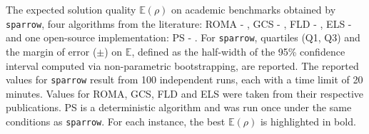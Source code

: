 \begin{table}[!tbp]
\captionsetup{width=0.95\textwidth}
\caption{
   The expected solution quality $\mathbb{E}(\rho)$ on academic benchmarks obtained by \texttt{sparrow}, four algorithms from the literature: ROMA - \cite{sato2019raster}, GCS - \cite{elkeran2013new}, FLD - \cite{wang2017flexible}, ELS - \cite{leung2012extended} and one open-source implementation: PS - \cite{fontan}. 
   For \texttt{sparrow}, quartiles (Q1, Q3) and the margin of error ($\pm$) on $\mathbb{E}$, defined as the half-width of the 95\% confidence interval computed via non-parametric bootstrapping, are reported.
   The reported values for \texttt{sparrow} result from 100 independent runs, each with a time limit of 20 minutes. 
   Values for ROMA, GCS, FLD and ELS were taken from their respective publications.
   PS is a deterministic algorithm and was run once under the same conditions as \texttt{sparrow}.
   For each instance, the best $\mathbb{E}(\rho)$ is highlighted in bold.
}
\label{tab:comparison}
\end{table}